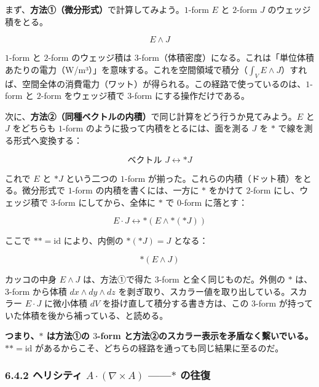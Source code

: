 \documentclass[a4paper,12pt,openany]{book}
\begin{document}
まず、\textbf{方法①（微分形式）}で計算してみよう。\(1\)-form \(E\) と
\(2\)-form \(J\) のウェッジ積をとる。

\[E \wedge J\]

\(1\)-form と \(2\)-form のウェッジ積は
\(3\)-form（体積密度）になる。これは「単位体積あたりの電力（W/m³）」を意味する。これを空間領域で積分（\(\int_V E \wedge J\)）すれば、空間全体の消費電力（ワット）が得られる。この経路で使っているのは、\(1\)-form
と \(2\)-form をウェッジ積で \(3\)-form にする操作だけである。

次に、\textbf{方法②（同種ベクトルの内積）}で同じ計算をどう行うか見てみよう。\(E\)
と \(J\) をどちらも \(1\)-form のように扱って内積をとるには、面を測る
\(J\) を \(\ast\) で線を測る形式へ変換する：

\[\text{ベクトル } J \longleftrightarrow \ast J\]

これで \(E\) と \(\ast J\) という二つの \(1\)-form
が揃った。これらの内積（ドット積）をとる。微分形式で \(1\)-form
の内積を書くには、一方に \(\ast\) をかけて \(2\)-form にし、ウェッジ積で
\(3\)-form にしてから、全体に \(\ast\) で \(0\)-form に落とす：

\[E \cdot J \longleftrightarrow \ast(E \wedge \ast(\ast J))\]

ここで \(\ast\ast = \mathrm{id}\) により、内側の \(\ast(\ast J) = J\)
となる：

\[\ast(E \wedge J)\]

カッコの中身 \(E \wedge J\) は、方法①で得た \(3\)-form
と全く同じものだ。外側の \(\ast\) は、\(3\)-form から体積
\(dx \wedge dy \wedge dz\)
を剥ぎ取り、スカラー値を取り出している。スカラー \(E \cdot J\)
に微小体積 \(dV\) を掛け直して積分する書き方は、この \(3\)-form
が持っていた体積を後から補っている、と読める。

\textbf{つまり、$\ast$ は方法①の $3$-form と方法②のスカラー表示を矛盾なく繫いでいる。}
\(\ast\ast = \mathrm{id}\)
があるからこそ、どちらの経路を通っても同じ結果に至るのだ。

\hypertarget{ux30d8ux30eaux30b7ux30c6ux30a3-a-cdot-nabla-times-a-ast-ux306eux5f80ux5fa9}{%
\subsubsection{\texorpdfstring{6.4.2 ヘリシティ
\(A \cdot (\nabla \times A)\) ——\(\ast\)
の往復}{6.4.2 ヘリシティ A \textbackslash cdot (\textbackslash nabla \textbackslash times A) ——\textbackslash ast の往復}}\label{ux30d8ux30eaux30b7ux30c6ux30a3-a-cdot-nabla-times-a-ast-ux306eux5f80ux5fa9}}
\end{document}
